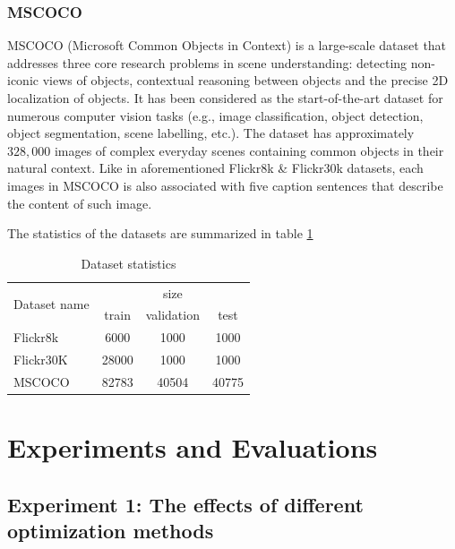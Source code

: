 \subsubsection{MSCOCO}
\label{sec:dataset_mscoco}

MSCOCO \cite{DBLP:journals/corr/LinMBHPRDZ14} (Microsoft Common Objects in Context) is a large-scale dataset that addresses three core research problems in scene understanding: detecting non-iconic views of objects, contextual reasoning between objects and the precise 2D localization of objects. It has been considered as the start-of-the-art dataset for numerous computer vision tasks (e.g., image classification, object detection, object segmentation, scene labelling, etc.). The dataset has approximately $328,000$ images of complex everyday scenes containing common objects in their natural context. Like in aforementioned Flickr8k \& Flickr30k datasets, each images in MSCOCO is also associated with five caption sentences that describe the content of such image.

The statistics of the datasets are summarized in table \ref{tab:dataset-statistics}
\begin{table}
	\centering
	\label{tab:dataset-statistics}
	\begin{tabular}{l|c|c|c}
		\toprule
		\multirow{2}{*}{Dataset name} & \multicolumn{3}{c}{size} \\ \cline{2-4}
		& train & validation & test \\ \midrule
		Flickr8k & 6000 & 1000 & 1000 \\
		Flickr30K & 28000 & 1000 & 1000 \\
		MSCOCO & 82783 & 40504 & 40775 \\
		\bottomrule
	\end{tabular}
	\caption{Dataset statistics}
\end{table}


\section{Experiments and Evaluations}
\label{sec:chap4_experiment}

\subsection{Experiment 1: The effects of different optimization methods}
